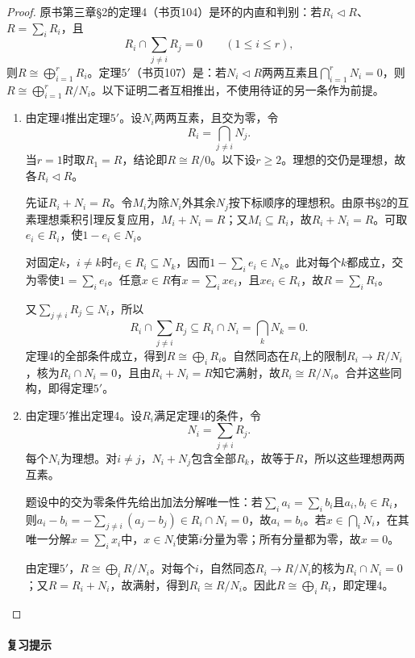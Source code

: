 \begin{proof}

原书第三章§2的定理4（书页104）是环的内直和判别：若$R_i\lhd R$、$R=\sum_iR_i$，且
\[
R_i\cap\sum_{j\ne i}R_j=0\qquad(1\le i\le r),
\]
则$R\cong\bigoplus\limits_{i=1}^rR_i$。定理$5'$（书页107）是：若$N_i\lhd R$两两互素且$\bigcap\limits_{i=1}^rN_i=0$，则$R\cong\bigoplus\limits_{i=1}^rR/N_i$。以下证明二者互相推出，不使用待证的另一条作为前提。

\begin{enumerate}
\item 由定理4推出定理$5'$。设$N_i$两两互素，且交为零，令
\[
R_i=\bigcap_{j\ne i}N_j.
\]
当$r=1$时取$R_1=R$，结论即$R\cong R/0$。以下设$r\ge2$。理想的交仍是理想，故各$R_i\lhd R$。

先证$R_i+N_i=R$。令$M_i$为除$N_i$外其余$N_j$按下标顺序的理想积。由原书§2的互素理想乘积引理反复应用，$M_i+N_i=R$；又$M_i\subseteq R_i$，故$R_i+N_i=R$。可取$e_i\in R_i$，使$1-e_i\in N_i$。

对固定$k$，$i\ne k$时$e_i\in R_i\subseteq N_k$，因而$1-\sum_i e_i\in N_k$。此对每个$k$都成立，交为零使$1=\sum_i e_i$。任意$x\in R$有$x=\sum_i xe_i$，且$xe_i\in R_i$，故$R=\sum_iR_i$。

又$\sum_{j\ne i}R_j\subseteq N_i$，所以
\[
R_i\cap\sum_{j\ne i}R_j\subseteq R_i\cap N_i=\bigcap_kN_k=0.
\]
定理4的全部条件成立，得到$R\cong\bigoplus_iR_i$。自然同态在$R_i$上的限制$R_i\to R/N_i$，核为$R_i\cap N_i=0$，且由$R_i+N_i=R$知它满射，故$R_i\cong R/N_i$。合并这些同构，即得定理$5'$。

\item 由定理$5'$推出定理4。设$R_i$满足定理4的条件，令
\[
N_i=\sum_{j\ne i}R_j.
\]
每个$N_i$为理想。对$i\ne j$，$N_i+N_j$包含全部$R_k$，故等于$R$，所以这些理想两两互素。

题设中的交为零条件先给出加法分解唯一性：若$\sum_i a_i=\sum_i b_i$且$a_i,b_i\in R_i$，则$a_i-b_i=-\sum_{j\ne i}(a_j-b_j)\in R_i\cap N_i=0$，故$a_i=b_i$。若$x\in\bigcap_iN_i$，在其唯一分解$x=\sum_i x_i$中，$x\in N_i$使第$i$分量为零；所有分量都为零，故$x=0$。

由定理$5'$，$R\cong\bigoplus_iR/N_i$。对每个$i$，自然同态$R_i\to R/N_i$的核为$R_i\cap N_i=0$；又$R=R_i+N_i$，故满射，得到$R_i\cong R/N_i$。因此$R\cong\bigoplus_iR_i$，即定理4。
\end{enumerate}

\end{proof}

\paragraph{复习提示}

